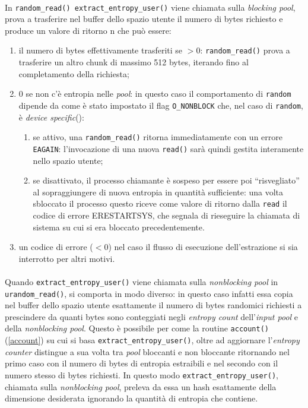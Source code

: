 \documentclass{article}
\begin{document}
  \paragraph{} In \verb+random_read() extract_entropy_user()+ viene chiamata sulla
 \emph{blocking pool}, prova a trasferire nel buffer dello spazio utente il
 numero di bytes richiesto e produce un valore di ritorno n che può essere:
 \begin{enumerate}
   \item il numero di bytes effettivamente trasferiti se $> 0$:
   \verb+random_read()+ prova a trasferire un altro chunk di massimo 512
   bytes, iterando fino al completamento della richiesta;
   \item 0 se non c'è entropia nelle \emph{pool}: in questo caso il
   comportamento di \verb+random+ dipende da come è stato impostato il flag
   \verb+O_NONBLOCK+ che, nel caso di \verb+random+, è
   \emph{device specific}(\cite{kerr}):
   \begin{enumerate}
     \item se attivo, una \verb+random_read()+ ritorna immediatamente con un
     errore \verb+EAGAIN+: l'invocazione di una nuova \verb+read()+ sarà quindi
     gestita interamente nello spazio utente;
     \item se disattivato, il processo chiamante è sospeso per essere
     poi ``risvegliato'' al sopraggiungere di nuova entropia in quantità
     sufficiente: una volta sbloccato il processo questo riceve come valore di
     ritorno dalla \verb+read+ il codice di errore ERESTARTSYS, che segnala di
     rieseguire la chiamata di sistema su cui si era bloccato precedentemente.
   \end{enumerate}
   \item un codice di errore ($< 0$) nel caso il flusso di esecuzione
   dell'estrazione si sia interrotto per altri motivi.
 \end{enumerate}
 
 \paragraph{} Quando \verb+extract_entropy_user()+ viene chiamata sulla
 \emph{nonblocking pool} in \verb+urandom_read()+, si comporta in modo diverso:
 in questo caso infatti essa copia nel buffer dello spazio utente esattamente
 il numero di bytes randomici richiesti a prescindere da quanti bytes sono
 conteggiati negli \emph{entropy count} dell'\emph{input pool} e della 
 \emph{nonblocking pool}. Questo è possibile per come la routine
 \verb+account()+ (\ref{account}) su cui si basa \verb+extract_entropy_user()+,
 oltre ad aggiornare l'\emph{entropy counter} distingue a sua volta tra
 \emph{pool} bloccanti e non bloccante ritornando nel primo caso con il numero
 di bytes di entropia estraibili e nel secondo con il numero stesso di
 bytes richiesti. In questo modo \verb+extract_entropy_user()+, chiamata sulla
 \emph{nonblocking pool}, preleva da essa un hash esattamente della dimensione
 desiderata ignorando la quantità di entropia che contiene.
 
\end{document}
